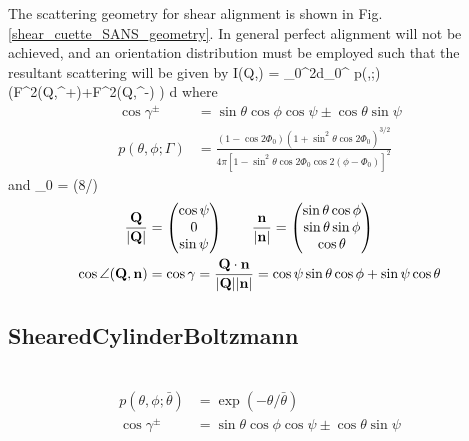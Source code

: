 The scattering geometry for shear alignment is shown in Fig.
\ref{shear_cuette_SANS_geometry}. In general perfect alignment
will not be achieved, and an orientation distribution must be
employed such that the resultant scattering will be given by
\BE
I(Q,\psi) = \int_0^{2\pi}d\varPhi \int_0^\pi
p(\theta,\varPhi;\Gamma)\, \left(F^2(Q,\gamma^+)+F^2(Q,\gamma^-)
\right) \sin\theta d\theta
\EE
where
\begin{align}
\cos\gamma^\pm & = \sin\theta\cos\phi\cos\psi\pm\cos\theta\sin\psi \\[3mm]
p(\theta,\phi;\Gamma) & = \frac{(1-\cos
2\varPhi_0)(1+\sin^2\theta\cos 2\varPhi_0)^{3/2}}{4\pi\left[
1-\sin^2\theta\cos 2\varPhi_0\cos 2(\phi-\varPhi_0)\right]^2}
\end{align}
and
\varPhi_0 = \arctan(8/\Gamma)
\EE
\begin{align}
\frac{\mathbf{Q}}{\abs{\mathbf{Q}}} &=
\begin{pmatrix}
\cos \psi \\
0  \\
\sin \psi
\end{pmatrix} \qquad
\frac{\mathbf{n}}{\abs{\mathbf{n}}} =
\begin{pmatrix}
\sin \theta \cos \phi \\
\sin \theta \sin \phi  \\
\cos \theta
\end{pmatrix} \\
\cos \angle(\mathbf{Q,n}) &= \cos \gamma = \frac{\mathbf{Q\cdot n}}{\abs{\mathbf{Q}}\abs{\mathbf{n}}} =  \cos\psi \sin\theta \cos\phi + \sin\psi \cos\theta
\end{align}



\newpage
\subsection{ShearedCylinderBoltzmann} ~\\

\begin{align}
p(\theta,\phi;\bar{\theta}) & = \exp(-\theta/\bar{\theta}) \\
\cos\gamma^\pm & = \sin\theta\cos\phi\cos\psi\pm\cos\theta\sin\psi
\end{align}

